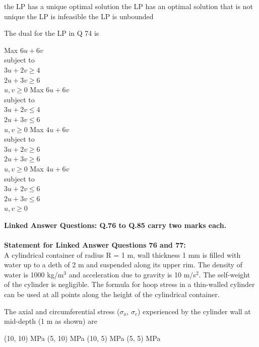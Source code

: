 \documentclass[addpoints,11pt]{exam}
\begin{document}
\begin{questions}
    \begin{oneparchoices}
        \choice the LP has a unique optimal solution
        \choice the LP has an optimal solution that is not unique
        \choice the LP is infeasible
        \choice the LP is unbounded
    \end{oneparchoices}

    \question The dual for the LP in Q 74 is

    \begin{choices}
        \choice Max $6u + 6v$\\
subject to\\
$3u+2v\ge4$\\
$2u+3v\ge6$\\
$u,v\ge0$
        \choice Max $6u + 6v$\\
subject to\\
$3u+2v\le4$\\
$2u+3v\le6$\\
$u,v\ge0$
        \choice Max $4u + 6v$\\
subject to\\
$3u+2v\ge6$\\
$2u+3v\ge6$\\
$u,v\ge0$
        \choice Max $4u + 6v$\\
subject to\\
$3u+2v\le6$\\
$2u+3v\le6$\\
$u,v\ge0$
    \end{choices}

\large\textbf{Linked Answer Questions: Q.76 to Q.85 carry two marks each.}\\\\
\normalsize\textbf{Statement for Linked Answer Questions 76 and 77:}\\

A cylindrical container of radius R = 1 m, wall thickness 1 mm is filled with water up to a deth of 2 m and suspended along its upper rim. The density of water is 1000 kg/m$^3$ and acceleration due to gravity is 10 m/s$^2$. The self-weight of the cylinder is negligible. The formula for hoop stress in a thin-walled cylinder can be used at all points along the height of the cylindrical container.%

    \question The axial and circumferential stress ($\sigma_a$, $\sigma_c$) experienced by the cylinder wall at mid-depth (1 m as shown) are

    \begin{oneparchoices}
        \choice (10, 10) MPa
        \choice (5, 10) MPa
        \choice (10, 5) MPa
        \choice (5, 5) MPa
    \end{oneparchoices}


\end{questions}
\end{document}
